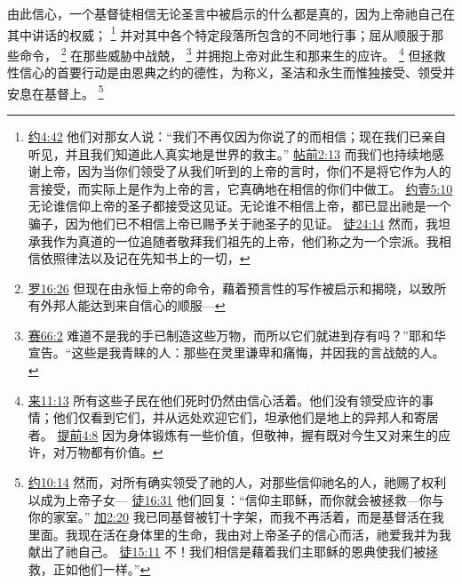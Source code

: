 \documentclass[12pt, a4paper, oneside]{ctexart}
\newcounter{parnum}[section]
\newcommand{\N}{%
   \noindent\refstepcounter{parnum}%
    \makebox[\parindent][l]{\textbf{\arabic{parnum}.}}}
\begin{document}
\N 由此信心，一个基督徒相信无论圣言中被启示的什么都是真的，因为上帝祂自己在其中讲话的权威；
	\footnote {
		\href{https://biblehub.com/john/4-42.htm}{约4:42} 他们对那女人说：“我们不再仅因为你说了的而相信；现在我们已亲自听见，并且我们知道此人真实地是世界的救主。”
		\href{https://biblehub.com/1_thessalonians/2-13.htm}{帖前2:13} 而我们也持续地感谢上帝，因为当你们领受了从我们听到的上帝的言时，你们不是将它作为人的言接受，而实际上是作为上帝的言，它真确地在相信的你们中做工。
		\href{https://biblehub.com/1_john/5-10.htm}{约壹5:10} 无论谁信仰上帝的圣子都接受这见证。无论谁不相信上帝，都已显出祂是一个骗子，因为他们已不相信上帝已赐予关于祂圣子的见证。
		\href{https://biblehub.com/acts/24-14.htm}{徒24:14} 然而，我坦承我作为真道的一位追随者敬拜我们祖先的上帝，他们称之为一个宗派。我相信依照律法以及记在先知书上的一切，
	}
	并对其中各个特定段落所包含的不同地行事；屈从顺服于那些命令，
	\footnote {
		\href{https://biblehub.com/romans/16-26.htm}{罗16:26} 但现在由永恒上帝的命令，藉着预言性的写作被启示和揭晓，以致所有外邦人能达到来自信心的顺服---
	}
	在那些威胁中战兢，
	\footnote {
		\href{https://biblehub.com/isaiah/66-2.htm}{赛66:2} 难道不是我的手已制造这些万物，而所以它们就进到存有吗？”耶和华宣告。“这些是我青睐的人：那些在灵里谦卑和痛悔，并因我的言战兢的人。
	}
	并拥抱上帝对此生和那来生的应许。
	\footnote {
		\href{https://biblehub.com/hebrews/11-13.htm}{来11:13} 所有这些子民在他们死时仍然由信心活着。他们没有领受应许的事情；他们仅看到它们，并从远处欢迎它们，坦承他们是地上的异邦人和寄居者。
		\href{https://biblehub.com/1_timothy/4-8.htm}{提前4:8} 因为身体锻炼有一些价值，但敬神，握有既对今生又对来生的应许，对万物都有价值。
	}
	但拯救性信心的首要行动是由恩典之约的德性，为称义，圣洁和永生而惟独接受、领受并安息在基督上。
	\footnote {
		\href{https://biblehub.com/john/1-12.htm}{约10:14} 然而，对所有确实领受了祂的人，对那些信仰祂名的人，祂赐了权利以成为上帝子女---
		\href{https://biblehub.com/acts/16-31.htm}{徒16:31} 他们回复：“信仰主耶稣，而你就会被拯救---你与你的家室。”
		\href{https://biblehub.com/galatians/2-20.htm}{加2:20} 我已同基督被钉十字架，而我不再活着，而是基督活在我里面。我现在活在身体里的生命，我由对上帝圣子的信心而活，祂爱我并为我献出了祂自己。
		\href{https://biblehub.com/acts/15-11.htm}{徒15:11} 不！我们相信是藉着我们主耶稣的恩典使我们被拯救，正如他们一样。”
	}
\end{document}
